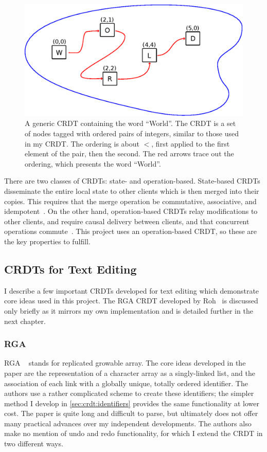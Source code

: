 \documentclass[12pt,a4paper,twoside,openright]{report}
\begin{document}
	\begin{figure}[H]
	\centering
	\includegraphics[width=1\linewidth]{figs/tagged_set.eps}
	\caption[Text CRDT as a tagged set]{A generic CRDT containing the word ``World''. The CRDT is a set of nodes tagged with ordered pairs of integers, similar to those used in my CRDT. The ordering is about $<$, first applied to the first element of the pair, then the second. The red arrows trace out the ordering, which presents the word ``World''.}
	\label{fig:taggedset}
	\end{figure}
	
	There are two classes of CRDTs: state- and operation-based. State-based CRDTs disseminate the entire local state to other clients which is then merged into their copies. This requires that the merge operation be commutative, associative, and idempotent~\cite{shapiro2011}. On the other hand, operation-based CRDTs relay modifications to other clients, and require causal delivery between clients, and that concurrent operations commute~\cite{takada2013}. This project uses an operation-based CRDT, so these are the key properties to fulfill.


	\subsection{CRDTs for Text Editing} \label{sec:relatedwork}
		
		I describe a few important CRDTs developed for text editing which demonstrate core ideas used in this project. The RGA CRDT developed by Roh~\cite{roh2011replicated} is discussed only briefly as it mirrors my own implementation and is detailed further in the next chapter.
		
		\subsubsection{RGA}	\label{sec:rga}
		RGA ~\cite{roh2011replicated} stands for replicated growable array. The core ideas developed in the paper are the representation of a character array as a singly-linked list, and the association of each link with a globally unique, totally ordered identifier. The authors use a rather complicated scheme to create these identifiers; the simpler method I develop in \cref{sec:crdt:identifiers} provides the same functionality at lower cost. The paper is quite long and difficult to parse, but ultimately does not offer many practical advances over my independent developments. The authors also make no mention of undo and redo functionality, for which I extend the CRDT in two different ways.
		
\end{document}
